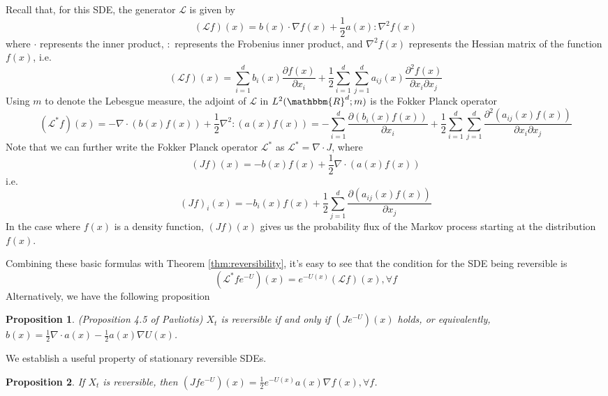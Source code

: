 \documentclass[english, aip, jcp, priprint, graphicx]{revtex4-1}
\newtheorem{proposition}{Proposition}
\theoremstyle{plain}
\theoremstyle{definition}
\theoremstyle{plain}
\begin{document}
Recall that, for this SDE, the generator $\mathcal{L}$ is given by
\[ (\mathcal{L} f) (x) = b (x) \cdot \nabla f (x) + \frac{1}{2} a (x) :
\nabla^2 f (x) \]
where $\cdot$ represents the inner product, $:$ represents the Frobenius inner
product, and $\nabla^2 f (x)$ represents the Hessian matrix of the function $f
(x)$, i.e.
\[ (\mathcal{L} f) (x) = \sum_{i = 1}^d b_i (x) \frac{\partial f
(x)}{\partial x_i} + \frac{1}{2} \sum_{i = 1}^d \sum_{j = 1}^d a_{ij} (x)
\frac{\partial^2 f (x)}{\partial x_i \partial x_j} \]
Using $m$ to denote the Lebesgue measure, the adjoint of $\mathcal{L}$ in $L^2
(\mathbbm{R}^d ; m)$ is the Fokker Planck operator
\[ (\mathcal{L}^{\ast} f) (x) = - \nabla \cdot (b (x) f (x)) + \frac{1}{2}
\nabla^2 : (a (x) f (x)) = - \sum_{i = 1}^d \frac{\partial (b_i (x) f
(x))}{\partial x_i} + \frac{1}{2} \sum_{i = 1}^d \sum_{j = 1}^d
\frac{\partial^2 (a_{ij} (x) f (x))}{\partial x_i \partial x_j} \]
Note that we can further write the Fokker Planck operator $\mathcal{L}^{\ast}$
as $\mathcal{L}^{\ast} = \nabla \cdot J$, where
\[ (J f) (x) = - b (x) f (x) + \frac{1}{2} \nabla \cdot (a (x) f (x)) \]
i.e.
\[ (J f)_i (x) = - b_i (x) f (x) + \frac{1}{2} \sum_{j = 1}^d \frac{\partial
(a_{ij} (x) f (x))}{\partial x_j} \]
In the case where $f (x)$ is a density function, $(J f) (x)$ gives us the
probability flux of the Markov process starting at the distribution $f (x)$.

Combining these basic formulas with Theorem \ref{thm:reversibility}, it's easy
to see that the condition for the SDE being reversible is
\[ (\mathcal{L}^{\ast} f e^{-U}) (x) = e^{- U (x)} (\mathcal{L} f) (x),
\forall f \]
Alternatively, we have the following proposition

\begin{proposition}
(Proposition 4.5 of Pavliotis\cite{Pavliotis2016-xn}) $X_t$ is reversible if
and only if $(J e^{- U })(x)$ holds, or equivalently, $b (x) = \frac{1}{2}
\nabla \cdot a (x) - \frac{1}{2} a (x) \nabla U (x)$.
\end{proposition}

We establish a useful property of stationary reversible SDEs.

\begin{proposition}\label{prop:property_reversible_sde}
If $X_t$ is reversible, then $(J f e^{- U })(x) = \frac{1}{2} e^{- U
(x)} a (x) \nabla f (x) , \forall f$.
\end{proposition}
\end{document}
